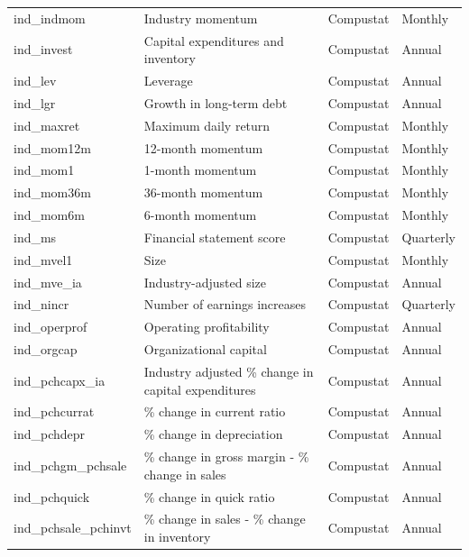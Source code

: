 \documentclass{article}
\begin{document}
\begin{center}
\begin{longtable}{llll}
			ind\_indmom & Industry momentum & Compustat & Monthly \\
			ind\_invest\footnotemark[\value{footnote}] & Capital expenditures and inventory & Compustat & Annual \\
			ind\_lev & Leverage & Compustat & Annual \\
			ind\_lgr & Growth in long-term debt & Compustat & Annual \\
			ind\_maxret & Maximum daily return & Compustat & Monthly \\
			ind\_mom12m & 12-month momentum & Compustat & Monthly \\
			ind\_mom1 & 1-month momentum & Compustat & Monthly \\
			ind\_mom36m\footnotemark[\value{footnote}] & 36-month momentum & Compustat & Monthly \\
			ind\_mom6m & 6-month momentum & Compustat & Monthly \\
			ind\_ms & Financial statement score & Compustat & Quarterly \\
			ind\_mvel1 & Size & Compustat & Monthly \\
			ind\_mve\_ia & Industry-adjusted size & Compustat & Annual \\
			ind\_nincr & Number of earnings increases & Compustat & Quarterly \\
			ind\_operprof\footnotemark[\value{footnote}] & Operating profitability & Compustat & Annual \\
			ind\_orgcap\footnotemark[\value{footnote}] & Organizational capital & Compustat & Annual \\
			ind\_pchcapx\_ia\footnotemark[\value{footnote}] & Industry adjusted \% change in capital expenditures & Compustat & Annual \\
			ind\_pchcurrat\footnotemark[\value{footnote}] & \% change in current ratio & Compustat & Annual \\
			ind\_pchdepr\footnotemark[\value{footnote}] & \% change in depreciation & Compustat & Annual \\
			ind\_pchgm\_pchsale\footnotemark[\value{footnote}] & \% change in gross margin - \% change in sales & Compustat & Annual \\
			ind\_pchquick\footnotemark[\value{footnote}] & \% change in quick ratio & Compustat & Annual \\
			ind\_pchsale\_pchinvt\footnotemark[\value{footnote}] & \% change in sales - \% change in inventory & Compustat & Annual \\

\end{longtable}
\end{center}
\end{document}
